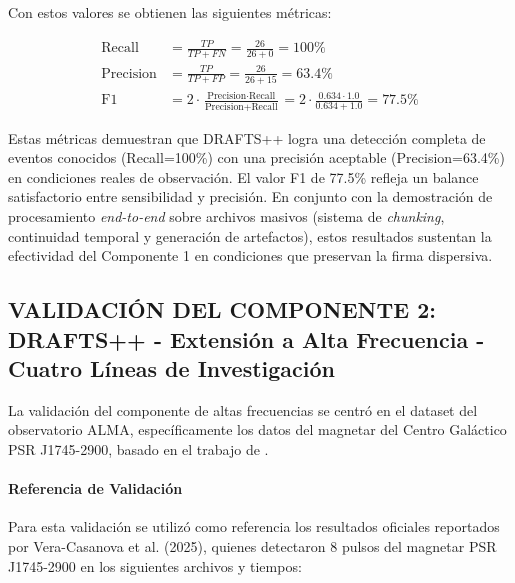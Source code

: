 Con estos valores se obtienen las siguientes métricas:

\begin{align}
\text{Recall} &= \frac{TP}{TP + FN} = \frac{26}{26 + 0} = 100\% \\
\text{Precision} &= \frac{TP}{TP + FP} = \frac{26}{26 + 15} = 63.4\% \\
\text{F1} &= 2 \cdot \frac{\text{Precision} \cdot \text{Recall}}{\text{Precision} + \text{Recall}} = 2 \cdot \frac{0.634 \cdot 1.0}{0.634 + 1.0} = 77.5\%
\end{align}

Estas métricas demuestran que DRAFTS++ logra una detección completa de eventos conocidos (Recall=100\%) con una precisión aceptable (Precision=63.4\%) en condiciones reales de observación. El valor F1 de 77.5\% refleja un balance satisfactorio entre sensibilidad y precisión. En conjunto con la demostración de procesamiento \emph{end-to-end} sobre archivos masivos (sistema de \textit{chunking}, continuidad temporal y generación de artefactos), estos resultados sustentan la efectividad del Componente 1 en condiciones que preservan la firma dispersiva.

\subsection{VALIDACIÓN DEL COMPONENTE 2: DRAFTS++ - Extensión a Alta Frecuencia - Cuatro Líneas de Investigación}

La validación del componente de altas frecuencias se centró en el dataset del observatorio ALMA, específicamente los datos del magnetar del Centro Galáctico PSR J1745-2900, basado en el trabajo de \cite{veracasanova2025}.

\paragraph{Referencia de Validación}

Para esta validación se utilizó como referencia los resultados oficiales reportados por Vera-Casanova et al. (2025), quienes detectaron 8 pulsos del magnetar PSR J1745-2900 en los siguientes archivos y tiempos:

